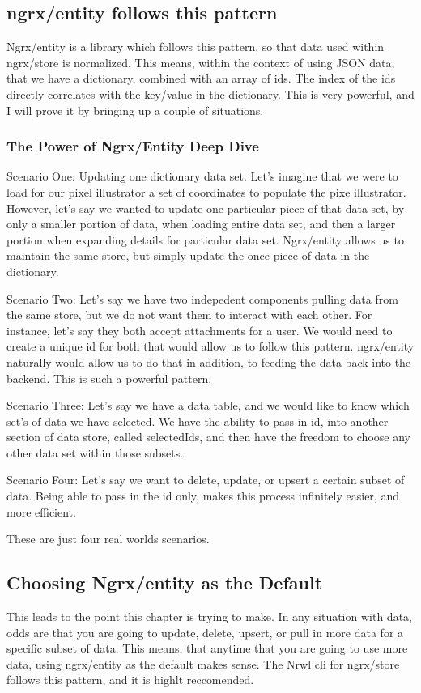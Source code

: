 \subsection{ngrx/entity follows this pattern}
Ngrx/entity is a library which follows this pattern, so that data used within
ngrx/store is normalized. This means, within the context of using JSON data,
that we have a dictionary, combined with an array of ids. The index of the ids
directly correlates with the key/value in the dictionary. This is very powerful,
and I will prove it by bringing up a couple of situations.

\subsubsection{The Power of Ngrx/Entity Deep Dive}
Scenario One:
Updating one dictionary data set. Let's imagine that we were to load for our
pixel illustrator a set of coordinates to populate the pixe illustrator. However,
let's say we wanted to update one particular piece of that data set, by only
a smaller portion of data, when loading entire data set, and then a larger portion
when expanding details for particular data set. Ngrx/entity allows us to maintain
the same store, but simply update the once piece of data in the dictionary.

Scenario Two:
Let's say we have two indepedent components pulling data from the same store,
but we do not want them to interact with each other. For instance, let's say they
both accept attachments for a user. We would need to create a unique id for both
that would allow us to follow this pattern. ngrx/entity naturally would allow us
to do that in addition, to feeding the data back into the backend. This is such a
powerful pattern.

Scenario Three:
Let's say we have a data table, and we would like to know which set's of data
we have selected. We have the ability to pass in id, into another section of
data store, called selectedIds, and then have the freedom to choose any other
data set within those subsets.

Scenario Four:
Let's say we want to delete, update, or upsert a certain subset of data. Being
able to pass in the id only, makes this process infinitely easier, and more
efficient.

These are just four real worlds scenarios.

\subsection{Choosing Ngrx/entity as the Default}
This leads to the point this chapter is trying to make. In any situation with
data, odds are that you are going to update, delete, upsert, or pull in more
data for a specific subset of data. This means, that anytime that you are going
to use more data, using ngrx/entity as the default makes sense. The Nrwl cli
for ngrx/store follows this pattern, and it is highlt reccomended.
